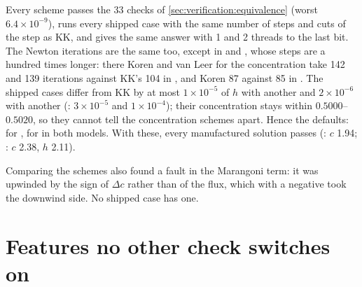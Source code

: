 Every scheme passes the 33 checks of \cref{sec:verification:equivalence}
(worst $6.4\times10^{-9}$), runs every shipped case with the same number of
steps and cuts of the step as KK, and gives the same answer with 1 and 2
threads to the last bit. The Newton iterations are the same too, except in
 and , whose steps are a hundred times
longer: there Koren and van Leer for the concentration take 142 and 139
iterations against KK's 104 in , and Koren 87 against 85 in
. The shipped cases differ
from KK by at most $1\times10^{-5}$ of $h$ with another  and
$2\times10^{-6}$ with another  (:
$3\times10^{-5}$ and $1\times10^{-4}$); their concentration stays within
$0.5000$--$0.5020$, so they cannot tell the concentration schemes apart. Hence the defaults:  for ,  for
 in both models. With these, every manufactured solution
passes (: $c$ 1.94; : $c$ 2.38, $h$ 2.11).

Comparing the schemes also found a fault in the Marangoni term: it was
upwinded by the sign of $\Delta c$ rather than of the flux, which with a
negative  took the downwind side. No
shipped case has one.

\section{Features no other check switches on}
\label{sec:verification:features}

